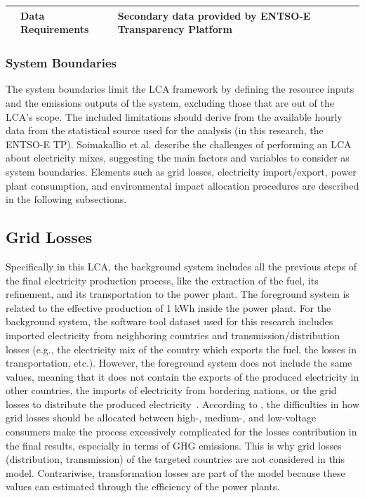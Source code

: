 \begin{table}[]
{\begin{tabular}{lll}
                                \\ \cline{2-3} 
                                & \textbf{Data Requirements}         & Secondary data provided by ENTSO-E Transparency Platform                                                                                                                   \\ \bottomrule
  \end{tabular}                              
\label{screeninglca}
}
\end{table}


\subsubsection{System Boundaries} \label{SB}
The system boundaries limit the LCA framework by defining the resource inputs and the emissions outputs of the system, excluding those that are out of the LCA's scope. The included limitations should derive from the available hourly data from the statistical source used for the analysis (in this research, the ENTSO-E TP). Soimakallio et al. \cite{Soimakallio2011} describe the challenges of performing an LCA about electricity mixes, suggesting the main factors and variables to consider as system boundaries. Elements such as grid losses, electricity import/export, power plant consumption, and environmental impact allocation procedures are described in the following subsections. 

\subsection*{Grid Losses} 
Specifically in this LCA, the background system includes all the previous steps of the final electricity production process, like the extraction of the fuel, its refinement, and its transportation to the power plant. The foreground system is related to the effective production of 1 kWh inside the power plant. For the background system, the software tool dataset used for this research includes imported electricity from neighboring countries and transmission/distribution losses (e.g., the electricity mix of the country which exports the fuel, the losses in transportation, etc.). However, the foreground system does not include the same values, meaning that it does not contain the exports of the produced electricity in other countries, the imports of electricity from bordering nations, or the grid losses to distribute the produced electricity~\cite{PEInternational2014GaBiV6}. According to \cite{Soimakallio2011}, the difficulties in how  grid losses should be allocated between high-, medium-, and low-voltage consumers make the process excessively complicated for the losses contribution in the final results, especially in terms of GHG emissions. This is why grid losses (distribution, transmission) of the targeted countries are not considered in this model. Contrariwise, transformation losses are part of the model because these values can estimated through the efficiency of the power plants. 

